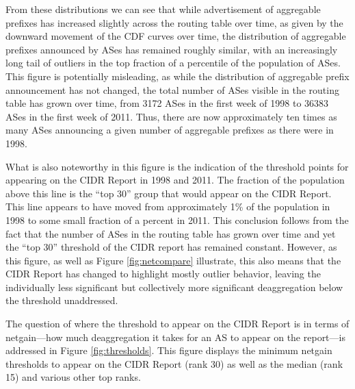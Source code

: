 From these distributions we can see that while advertisement of aggregable
prefixes has increased slightly across the routing table over time, as given by
the downward movement of the CDF curves over time, the distribution of
aggregable prefixes announced by ASes has remained roughly similar, with an
increasingly long tail of outliers in the top fraction of a percentile of
the population of ASes. This figure is potentially misleading, as while the
distribution of aggregable prefix announcement has not changed, the total
number of ASes visible in the routing table has grown over time, from 3172 ASes
in the first week of 1998 to 36383 ASes in the first week of 2011. Thus, there
are now approximately ten times as many ASes announcing a given number of
aggregable prefixes as there were in 1998.

What is also noteworthy in this figure is the indication of the threshold
points for appearing on the CIDR Report in 1998 and 2011. The fraction of the
population above this line is the ``top 30'' group that would appear on the
CIDR Report. This line appears to have moved from approximately 1\% of the
population in 1998 to some small fraction of a percent in 2011. This conclusion
follows from the fact that the number of ASes in the routing table has grown
over time and yet the ``top 30'' threshold of the CIDR report has remained
constant. However, as this figure, as well as Figure \ref{fig:netcompare}
illustrate, this also means that the CIDR Report has changed to highlight
mostly outlier behavior, leaving the individually less significant but
collectively more significant deaggregation below the threshold unaddressed.


The question of where the threshold to appear on the CIDR Report is in terms of
netgain---how much deaggregation it takes for an AS to appear on the
report---is addressed in Figure \ref{fig:thresholds}. This figure displays the
minimum netgain thresholds to appear on the CIDR Report (rank 30) as well as
the median (rank 15) and various other top ranks.

